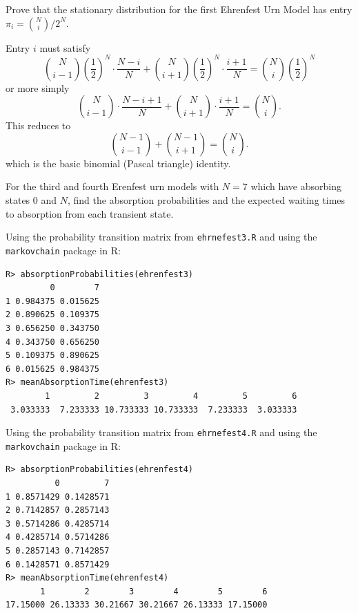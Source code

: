 \documentclass[12pt]{article}
\begin{document}
\begin{exercise}
Prove that the stationary distribution for the first Ehrenfest Urn
Model has entry \( \pi_i = \binom{N}{i}/2^N \).
\end{exercise}

\begin{solution}
  Entry \( i \) must satisfy
  \[
    \binom{N}{i-1}\left( \frac{1}{2} \right)^N \cdot \frac{N-i}{N} +
    \binom{N}{i+1}\left( \frac{1}{2} \right)^N \cdot \frac{i+1}{N} =
    \binom{N}{i}\left( \frac{1}{2} \right)^N
  \]
  or more simply
  \[
    \binom{N}{i-1} \cdot \frac{N-i+1}{N} +
    \binom{N}{i+1} \cdot \frac{i+1}{N} =
    \binom{N}{i}.
  \]
  This reduces to
  \[
    \binom{N-1}{i-1} +
    \binom{N-1}{i+1} =
    \binom{N}{i}.
  \]
  which is the basic binomial (Pascal triangle) identity.
\end{solution}

\begin{exercise}
For the third and fourth Erenfest urn models with \( N = 7 \) which
have absorbing states \( 0 \) and \( N \), find the absorption
probabilities and the expected waiting times to absorption from each
transient state.
\end{exercise}
\begin{solution}
Using the probability transition matrix from \texttt{ehrnefest3.R} and
using the \texttt{markovchain} package in R:
\begin{verbatim}
R> absorptionProbabilities(ehrenfest3)
         0        7
1 0.984375 0.015625
2 0.890625 0.109375
3 0.656250 0.343750
4 0.343750 0.656250
5 0.109375 0.890625
6 0.015625 0.984375
R> meanAbsorptionTime(ehrenfest3)
        1         2         3         4         5         6 
 3.033333  7.233333 10.733333 10.733333  7.233333  3.033333 
\end{verbatim}

Using the probability transition matrix from \texttt{ehrnefest4.R} and
using the \texttt{markovchain} package in R:
\begin{verbatim}
R> absorptionProbabilities(ehrenfest4)
          0         7
1 0.8571429 0.1428571
2 0.7142857 0.2857143
3 0.5714286 0.4285714
4 0.4285714 0.5714286
5 0.2857143 0.7142857
6 0.1428571 0.8571429
R> meanAbsorptionTime(ehrenfest4)
       1        2        3        4        5        6 
17.15000 26.13333 30.21667 30.21667 26.13333 17.15000 
\end{verbatim}
\end{solution}
\end{document}
